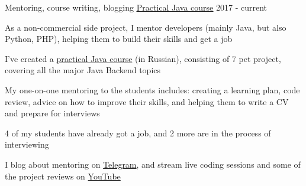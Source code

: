 \begin{cventries}

  \cventry
    {}
    {Mentoring, course writing, blogging}
    {\color{awesome-skyblue}\href{https://zhukovsd.github.io/java-backend-learning-course/}{\underline{Practical Java course}}}
    {2017 - current}
    {
      \begin{cvitems} %
        \item {As a non-commercial side project, I mentor developers (mainly Java, but also Python, PHP), helping them to build their skills and get a job}
        \item {I've created a {\color{awesome-skyblue}\href{https://zhukovsd.github.io/java-backend-learning-course/}{practical Java course}} (in Russian), consisting of 7 pet project, covering all the major Java Backend topics}
        \item {My one-on-one mentoring to the students includes: creating a learning plan, code review, advice on how to improve their skills, and helping them to write a CV and prepare for interviews}
        \item {4 of my students have already got a job, and 2 more are in the process of interviewing}
        \item {I blog about mentoring on {\color{awesome-skyblue}\href{https://t.me/zhukovsd_it_mentor}{Telegram}}, and stream live coding sessions and some of the project reviews on {\color{awesome-skyblue}\href{https://www.youtube.com/@zhukovsd_it_mentor}{YouTube}}}
      \end{cvitems}
    }

\end{cventries}
